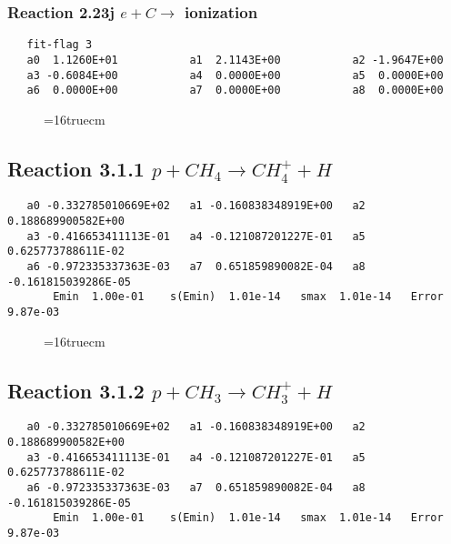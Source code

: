 \documentclass[12pt]{article}
\begin{document}
 
\subsubsection{
Reaction 2.23j    $e + C \rightarrow$ ionization
}

\begin{small}\begin{verbatim}
   fit-flag 3
   a0  1.1260E+01           a1  2.1143E+00           a2 -1.9647E+00 
   a3 -0.6084E+00           a4  0.0000E+00           a5  0.0000E+00
   a6  0.0000E+00           a7  0.0000E+00           a8  0.0000E+00   
\end{verbatim}\end{small}

 
\begin{figure} \label{met.1_2.23}
\epsfxsize=16truecm
\end{figure}
\newpage

\subsection{ 
Reaction 3.1.1    $p + CH_4 \rightarrow CH_4^+ + H$
}

\begin{small}\begin{verbatim} 
   a0 -0.332785010669E+02   a1 -0.160838348919E+00   a2  0.188689900582E+00
   a3 -0.416653411113E-01   a4 -0.121087201227E-01   a5  0.625773788611E-02
   a6 -0.972335337363E-03   a7  0.651859890082E-04   a8 -0.161815039286E-05
       Emin  1.00e-01    s(Emin)  1.01e-14   smax  1.01e-14   Error  9.87e-03
\end{verbatim}\end{small}

\begin{figure} \label{met.1_3.1.1}
\epsfxsize=16truecm
\end{figure}
\newpage
 

\subsection{ 
Reaction 3.1.2    $p + CH_3 \rightarrow CH_3^+ + H$
}

\begin{small}\begin{verbatim}
   a0 -0.332785010669E+02   a1 -0.160838348919E+00   a2  0.188689900582E+00
   a3 -0.416653411113E-01   a4 -0.121087201227E-01   a5  0.625773788611E-02
   a6 -0.972335337363E-03   a7  0.651859890082E-04   a8 -0.161815039286E-05
       Emin  1.00e-01    s(Emin)  1.01e-14   smax  1.01e-14   Error  9.87e-03
 \end{verbatim}\end{small}
\end{document}
